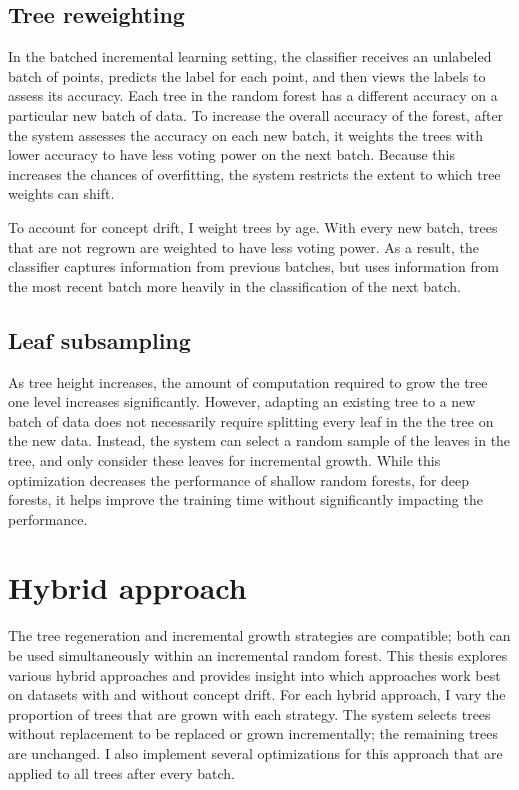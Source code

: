 \subsection{Tree reweighting}

In the batched incremental learning setting, the classifier receives an
unlabeled batch of points, predicts the label for each point, and then views
the labels to assess its accuracy. Each tree in the random forest has a
different accuracy on a particular new batch of data. To increase the overall
accuracy of the forest, after the system assesses the accuracy on each new
batch, it weights the trees with lower accuracy to have less voting power on
the next batch. Because this increases the chances of overfitting, the system
restricts the extent to which tree weights can shift.

To account for concept drift, I weight trees by age. With every new batch,
trees that are not regrown are weighted to have less voting power. As a result,
the classifier captures information from previous batches, but uses information
from the most recent batch more heavily in the classification of the next
batch.

\subsection{Leaf subsampling}

As tree height increases, the amount of computation required to grow the tree
one level increases significantly. However, adapting an existing tree to a new
batch of data does not necessarily require splitting every leaf in the the tree
on the new data. Instead, the system can select a random sample of the leaves
in the tree, and only consider these leaves for incremental growth. While this
optimization decreases the performance of shallow random forests, for deep
forests, it helps improve the training time without significantly impacting the
performance.

\section{Hybrid approach}

The tree regeneration and incremental growth strategies are compatible; both
can be used simultaneously within an incremental random forest. This thesis
explores various hybrid approaches and provides insight into which approaches
work best on datasets with and without concept drift. For each hybrid approach,
I vary the proportion of trees that are grown with each strategy. The system
selects trees without replacement to be replaced or grown incrementally; the
remaining trees are unchanged. I also implement several optimizations for this
approach that are applied to all trees after every batch.

